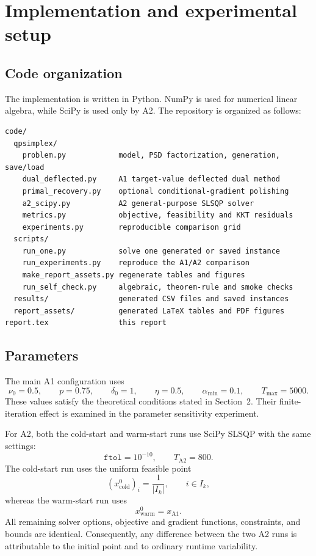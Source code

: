 \documentclass[12pt]{article}
\begin{document}
\section{Implementation and experimental setup}

\subsection{Code organization}

The implementation is written in Python. NumPy is used for numerical linear algebra, while SciPy is used only by A2. The repository is organized as follows:
\begin{lstlisting}
code/
  qpsimplex/
    problem.py            model, PSD factorization, generation, save/load
    dual_deflected.py     A1 target-value deflected dual method
    primal_recovery.py    optional conditional-gradient polishing
    a2_scipy.py           A2 general-purpose SLSQP solver
    metrics.py            objective, feasibility and KKT residuals
    experiments.py        reproducible comparison grid
  scripts/
    run_one.py            solve one generated or saved instance
    run_experiments.py    reproduce the A1/A2 comparison
    make_report_assets.py regenerate tables and figures
    run_self_check.py     algebraic, theorem-rule and smoke checks
  results/                generated CSV files and saved instances
  report_assets/          generated LaTeX tables and PDF figures
report.tex                this report
\end{lstlisting}

\subsection{Parameters}

The main A1 configuration uses
\[
\nu_0=0.5,
\qquad
p=0.75,
\qquad
\delta_0=1,
\qquad
\eta=0.5,
\qquad
\alpha_{\min}=0.1,
\qquad
T_{\max}=5000.
\]
These values satisfy the theoretical conditions stated in
Section~2. Their finite-iteration effect is examined in the parameter
sensitivity experiment.

For A2, both the cold-start and warm-start runs use SciPy SLSQP with
the same settings:
\[
\texttt{ftol}=10^{-10},
\qquad
T_{\mathrm{A2}}=800.
\]
The cold-start run uses the uniform feasible point
\[
(x^0_{\mathrm{cold}})_i=\frac{1}{|I_k|},
\qquad i\in I_k,
\]
whereas the warm-start run uses
\[
x^0_{\mathrm{warm}}=x_{\mathrm{A1}}.
\]
All remaining solver options, objective and gradient functions,
constraints, and bounds are identical. Consequently, any difference
between the two A2 runs is attributable to the initial point and to
ordinary runtime variability.
\end{document}
